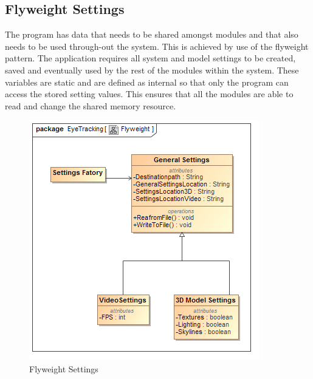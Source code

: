\subsection{Flyweight Settings}
The program has data that needs to be shared amongst modules and that also needs to be used through-out the system. This is achieved by use of the flyweight pattern. The application requires all system and model settings to be created, saved and eventually used by the rest of the modules within the system. These variables are static and are defined as internal so that only the program can access the stored setting values. This ensures that all the modules are able to read and change the shared memory resource.

\begin{figure}[!ht]
		\centering
		\includegraphics[scale=0.5]{Diagrams/Class_Diagram__Flyweight.png}
		\caption{Flyweight Settings}
	\end{figure}



